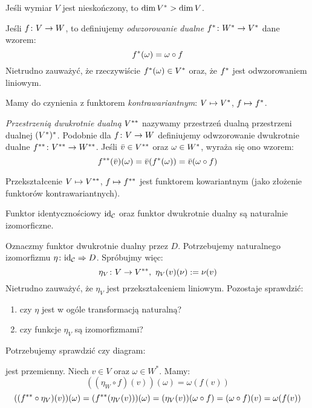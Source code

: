 {\begin{remk}
  Jeśli wymiar $V$ jest nieskończony, to $\dim {V}^{*} > \dim V$.
\end{remk}

\begin{defn}
  Jeśli $f\colon V\to W$, to definiujemy \emph{odwzorowanie dualne} ${f}^{*}\colon {W}^{*}\to {V}^{*}$ dane wzorem:
  $${f}^{*}(\omega) = \omega \circ f$$
  Nietrudno zauważyć, że rzeczywiście ${f}^{*}(\omega)\in {V}^{*}$ oraz, że ${f}^{*}$ jest odwzorowaniem liniowym.
\end{defn}

\begin{remk}
  Mamy do czynienia z funktorem \emph{kontrawariantnym}: $V\mapsto {V}^{*}$, $f\mapsto {f}^{*}$.
\end{remk}

\begin{defn}
  \emph{Przestrzenią dwukrotnie dualną} ${V}^{**}$ nazywamy przestrzeń dualną przestrzeni dualnej $({V}^{*})^*$. Podobnie dla $f\colon V\to W$ definiujemy odwzorowanie dwukrotnie dualne ${f}^{**}\colon {V}^{**}\to {W}^{**}$.
  Jeśli $\bar v\in {V}^{**}$ oraz $\omega \in {W}^{*}$, wyraża się ono wzorem:
    $${f}^{**}(\bar v)(\omega) = \bar v({f}^{*}(\omega)) = \bar v(\omega\circ f)$$
\end{defn}

\begin{cor}
  Przekształcenie $V\mapsto {V}^{**}$, $f\mapsto {f}^{**}$ jest funktorem kowariantnym (jako złożenie funktorów kontrawariantnych).
\end{cor}

\begin{thm}
  Funktor identycznościowy $\mathrm{id}_{\mathcal C}$ oraz funktor dwukrotnie dualny są naturalnie izomorficzne.
\end{thm}

\begin{prof}
  Oznaczmy funktor dwukrotnie dualny przez $D$. Potrzebujemy naturalnego izomorfizmu $\eta\colon \mathrm{id}_{\mathcal C}\Rightarrow D$. Spróbujmy więc:
  $$\eta_V\colon V\to {V}^{**},~\eta_V(v)(\nu) := \nu(v)$$
  Nietrudno zauważyć, że $\eta_V$ jest przekształceniem liniowym. Pozostaje sprawdzić:
  \begin{enumerate}
    \item czy $\eta$ jest w ogóle transformacją naturalną?
    \item czy funkcje $\eta_V$ są izomorfizmami?
  \end{enumerate}
  Potrzebujemy sprawdzić czy diagram:
  \begin{center}
  \end{center}
  jest przemienny. Niech $v\in V$ oraz $\omega\in W^*$. Mamy:
  $$((\eta_W\circ f)(v))(\omega)=\omega(f(v))$$
  $$(({f}^{**}\circ \eta_V)(v))(\omega) = ( {f}^{**}(\eta_V(v)))(\omega) = (\eta_V(v))(\omega\circ f) = (\omega\circ f)(v) = \omega(f(v))$$


\end{prof}}
